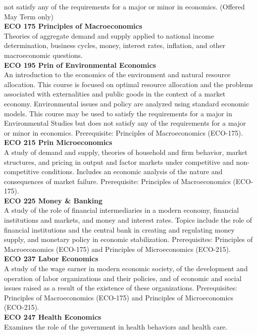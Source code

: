 \documentclass[
  letterpaper,
]{scrbook}
\begin{document}
not satisfy any of the requirements for a major or minor in economics.
(Offered May Term only)\\
\textbf{ECO 175 Principles of Macroeconomics}\\
Theories of aggregate demand and supply applied to national income
determination, business cycles, money, interest rates, inflation, and
other macroeconomic questions.\\
\textbf{ECO 195 Prin of Environmental Economics}\\
An introduction to the economics of the environment and natural resource
allocation. This course is focused on optimal resource allocation and
the problems associated with externalities and public goods in the
context of a market economy. Environmental issues and policy are
analyzed using standard economic models. This course may be used to
satisfy the requirements for a major in Environmental Studies but does
not satisfy any of the requirements for a major or minor in economics.
Prerequisite: Principles of Macroeconomics (ECO-175).\\
\textbf{ECO 215 Prin Microeconomics}\\
A study of demand and supply, theories of household and firm behavior,
market structures, and pricing in output and factor markets under
competitive and non-competitive conditions. Includes an economic
analysis of the nature and consequences of market failure. Prerequisite:
Principles of Macroeconomics (ECO-175).\\
\textbf{ECO 225 Money \& Banking}\\
A study of the role of financial intermediaries in a modern economy,
financial institutions and markets, and money and interest rates. Topics
include the role of financial institutions and the central bank in
creating and regulating money supply, and monetary policy in economic
stabilization. Prerequisites: Principles of Macroeconomics (ECO-175) and
Principles of Microeconomics (ECO-215).\\
\textbf{ECO 237 Labor Economics}\\
A study of the wage earner in modern economic society, of the
development and operation of labor organizations and their policies, and
of economic and social issues raised as a result of the existence of
these organizations. Prerequisites: Principles of Macroeconomics
(ECO-175) and Principles of Microeconomics (ECO-215).\\
\textbf{ECO 247 Health Economics}\\
Examines the role of the government in health behaviors and health care.
\end{document}
